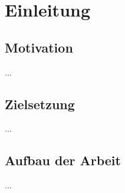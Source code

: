\chapter{Einleitung}


\section{Motivation}

...

\section{Zielsetzung}

...

\section{Aufbau der Arbeit}

...
